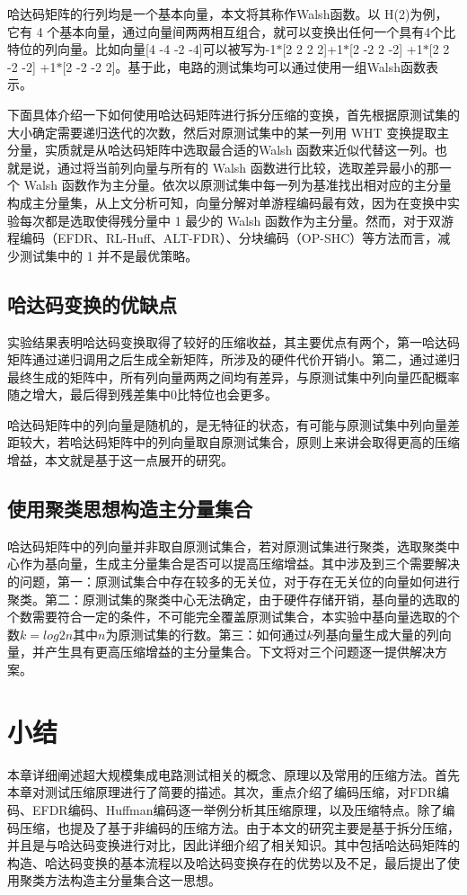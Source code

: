 哈达码矩阵的行列均是一个基本向量，本文将其称作Walsh函数。以 H(2)为例，它有 4 个基本向量，通过向量间两两相互组合，就可以变换出任何一个具有4个比特位的列向量。比如向量[4 -4 -2 -4]可以被写为-1$\ast$[2 2 2 2]+1$\ast$[2 -2 2 -2] +1$\ast$[2 2 -2 -2] +1$\ast$[2 -2 -2 2]。基于此，电路的测试集均可以通过使用一组Walsh函数表示。

下面具体介绍一下如何使用哈达码矩阵进行拆分压缩的变换，首先根据原测试集的大小确定需要递归迭代的次数，然后对原测试集中的某一列用 WHT 变换提取主分量，实质就是从哈达码矩阵中选取最合适的Walsh 函数来近似代替这一列。也就是说，通过将当前列向量与所有的 Walsh 函数进行比较，选取差异最小的那一个 Walsh 函数作为主分量。依次以原测试集中每一列为基准找出相对应的主分量构成主分量集，从上文分析可知，向量分解对单游程编码最有效，因为在变换中实验每次都是选取使得残分量中 1 最少的 Walsh 函数作为主分量。然而，对于双游程编码（EFDR、RL-Huff、ALT-FDR）、分块编码（OP-SHC）等方法而言，减少测试集中的 1 并不是最优策略。

\subsection{哈达码变换的优缺点}

实验结果表明哈达码变换取得了较好的压缩收益，其主要优点有两个，第一哈达码矩阵通过递归调用之后生成全新矩阵，所涉及的硬件代价开销小。第二，通过递归最终生成的矩阵中，所有列向量两两之间均有差异，与原测试集中列向量匹配概率随之增大，最后得到残差集中0比特位也会更多。

哈达码矩阵中的列向量是随机的，是无特征的状态，有可能与原测试集中列向量差距较大，若哈达码矩阵中的列向量取自原测试集合，原则上来讲会取得更高的压缩增益，本文就是基于这一点展开的研究。

\subsection{使用聚类思想构造主分量集合}

哈达码矩阵中的列向量并非取自原测试集合，若对原测试集进行聚类，选取聚类中心作为基向量，生成主分量集合是否可以提高压缩增益。其中涉及到三个需要解决的问题，第一：原测试集合中存在较多的无关位，对于存在无关位的向量如何进行聚类。第二：原测试集的聚类中心无法确定，由于硬件存储开销，基向量的选取的个数需要符合一定的条件，不可能完全覆盖原测试集合，本实验中基向量选取的个数$k=log2n$其中$n$为原测试集的行数。第三：如何通过$k$列基向量生成大量的列向量，并产生具有更高压缩增益的主分量集合。下文将对三个问题逐一提供解决方案。

\section{小结}

本章详细阐述超大规模集成电路测试相关的概念、原理以及常用的压缩方法。首先本章对测试压缩原理进行了简要的描述。其次，重点介绍了编码压缩，对FDR编码、EFDR编码、Huffman编码逐一举例分析其压缩原理，以及压缩特点。除了编码压缩，也提及了基于非编码的压缩方法。由于本文的研究主要是基于拆分压缩，并且是与哈达码变换进行对比，因此详细介绍了相关知识。其中包括哈达码矩阵的构造、哈达码变换的基本流程以及哈达码变换存在的优势以及不足，最后提出了使用聚类方法构造主分量集合这一思想。


